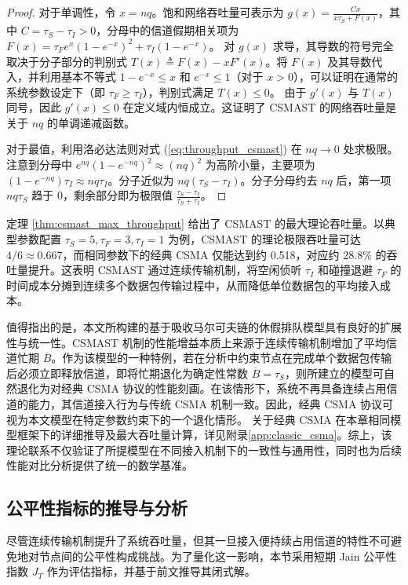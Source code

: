 \begin{proof}
	对于单调性，令 $x = nq$。饱和网络吞吐量可表示为 $g(x) = \frac{C x}{x \tau_S + F(x)}$，其中 $C = \tau_S - \tau_I > 0$，分母中的信道假期相关项为 $F(x) = \tau_F e^x (1 - e^{-x})^2 + \tau_I (1 - e^{-x})$。
	对 $g(x)$ 求导，其导数的符号完全取决于分子部分的判别式 $T(x) \triangleq F(x) - x F'(x)$。将 $F(x)$ 及其导数代入，并利用基本不等式 $1 - e^{-x} \le x$ 和 $e^{-x} \le 1$（对于 $x > 0$），可以证明在通常的系统参数设定下（即 $\tau_F \ge \tau_I$），判别式满足 $T(x) \le 0$。
	由于 $g'(x)$ 与 $T(x)$ 同号，因此 $g'(x) \le 0$ 在定义域内恒成立。这证明了 CSMAST 的网络吞吐量是关于 $nq$ 的单调递减函数。
	
	对于最值，利用洛必达法则对式 (\ref{eq:throughput_csmast}) 在 $nq \to 0$ 处求极限。注意到分母中 $e^{nq}(1-e^{-nq})^2 \approx (nq)^2$ 为高阶小量，主要项为 $(1-e^{-nq})\tau_I \approx nq \tau_I$。分子近似为 $nq(\tau_S - \tau_I)$。分子分母约去 $nq$ 后，第一项 $nq\tau_S$ 趋于 0，剩余部分即为极限值 $\frac{\tau_S - \tau_I}{\tau_S + \tau_I}$。
\end{proof}

定理 \ref{thm:csmast_max_throughput} 给出了 CSMAST 的最大理论吞吐量。以典型参数配置 $\tau_S=5, \tau_F=3, \tau_I=1$ 为例，CSMAST 的理论极限吞吐量可达 $4/6 \approx 0.667$，而相同参数下的经典 CSMA 仅能达到约 0.518，对应约 28.8\% 的吞吐量提升。这表明 CSMAST 通过连续传输机制，将空闲侦听 $\tau_I$ 和碰撞退避 $\tau_F$ 的时间成本分摊到连续多个数据包传输过程中，从而降低单位数据包的平均接入成本。

值得指出的是，本文所构建的基于吸收马尔可夫链的休假排队模型具有良好的扩展性与统一性。CSMAST 机制的性能增益本质上来源于连续传输机制增加了平均信道忙期 $\overline{B}$。作为该模型的一种特例，若在分析中约束节点在完成单个数据包传输后必须立即释放信道，即将忙期退化为确定性常数 $\overline{B} = \tau_S$，则所建立的模型可自然退化为对经典 CSMA 协议的性能刻画。在该情形下，系统不再具备连续占用信道的能力，其信道接入行为与传统 CSMA 机制一致。因此，经典 CSMA 协议可视为本文模型在特定参数约束下的一个退化情形。
关于经典 CSMA 在本章相同模型框架下的详细推导及最大吞吐量计算，详见附录\ref{app:classic_csma}。综上，该理论联系不仅验证了所提模型在不同接入机制下的一致性与通用性，同时也为后续性能对比分析提供了统一的数学基准。

\subsection{公平性指标的推导与分析}

尽管连续传输机制提升了系统吞吐量，但其一旦接入便持续占用信道的特性不可避免地对节点间的公平性构成挑战。为了量化这一影响，本节采用短期 Jain 公平性指数 $J_T$ 作为评估指标，并基于前文推导其闭式解。


